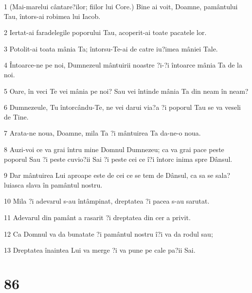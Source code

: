 \par 1 (Mai-marelui cântare?ilor; fiilor lui Core.) Bine ai voit, Doamne, pamântului Tau, întors-ai robimea lui Iacob.
\par 2 Iertat-ai faradelegile poporului Tau, acoperit-ai toate pacatele lor.
\par 3 Potolit-ai toata mânia Ta; întorsu-Te-ai de catre iu?imea mâniei Tale.
\par 4 Întoarce-ne pe noi, Dumnezeul mântuirii noastre ?i-?i întoarce mânia Ta de la noi.
\par 5 Oare, în veci Te vei mânia pe noi? Sau vei întinde mânia Ta din neam în neam?
\par 6 Dumnezeule, Tu întorcându-Te, ne vei darui via?a ?i poporul Tau se va veseli de Tine.
\par 7 Arata-ne noua, Doamne, mila Ta ?i mântuirea Ta da-ne-o noua.
\par 8 Auzi-voi ce va grai întru mine Domnul Dumnezeu; ca va grai pace peste poporul Sau ?i peste cuvio?ii Sai ?i peste cei ce î?i întorc inima spre Dânsul.
\par 9 Dar mântuirea Lui aproape este de cei ce se tem de Dânsul, ca sa se sala?luiasca slava în pamântul nostru.
\par 10 Mila ?i adevarul s-au întâmpinat, dreptatea ?i pacea s-au sarutat.
\par 11 Adevarul din pamânt a rasarit ?i dreptatea din cer a privit.
\par 12 Ca Domnul va da bunatate ?i pamântul nostru î?i va da rodul sau;
\par 13 Dreptatea înaintea Lui va merge ?i va pune pe cale pa?ii Sai.

\chapter{86}

